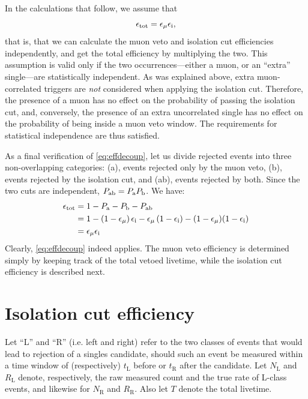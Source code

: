 \documentclass[../thesis.tex]{subfiles}
\begin{document}
In the calculations that follow, we assume that
\begin{equation}
  \label{eq:effdecoup}
  \epsilon_\mathrm{tot} = \epsilon_\mathrm{\mu} \epsilon_\mathrm{i},
\end{equation}
that is, that we can calculate the muon veto and isolation cut efficiencies
independently, and get the total efficiency by multiplying the two. This
assumption is valid only if the two occurrences---either a muon, or an ``extra''
single---are statistically independent. As was explained above, extra
muon-correlated triggers are \emph{not} considered when applying the isolation
cut. Therefore, the presence of a muon has no effect on the probability of
passing the isolation cut, and, conversely, the presence of an extra
uncorrelated single has no effect on the probability of being inside a muon veto
window. The requirements for statistical independence are thus satisfied.

As a final verification of \autoref{eq:effdecoup}, let us divide rejected events
into three non-overlapping categories: (a), events rejected only by the muon
veto, (b), events rejected by the isolation cut, and (ab), events rejected by
both. Since the two cuts are independent, $P_\mathrm{ab} = P_\mathrm{a}P_\mathrm{b}$. We have:
\begin{align*}
  \epsilon_\mathrm{tot} &= 1 - P_\mathrm{a} - P_\mathrm{b} - P_\mathrm{ab} \\
        &= 1 - (1-\epsilon_\mathrm{\mu})\,\epsilon_\mathrm{i} - \epsilon_\mathrm{\mu}\,(1-\epsilon_\mathrm{i}) - (1-\epsilon_\mathrm{\mu})(1-\epsilon_\mathrm{i}) \\
        &= \epsilon_\mathrm{\mu} \epsilon_\mathrm{i}
\end{align*}
Clearly, \autoref{eq:effdecoup} indeed applies. The muon veto efficiency is
determined simply by keeping track of the total vetoed livetime, while the
isolation cut efficiency is described next.


\section{Isolation cut efficiency}
\label{sec:isolcuteff}

\newcommand\NL{\ensuremath{N_{\mathrm{L}}}}
\newcommand\RL{\ensuremath{R_{\mathrm{L}}}}
\newcommand\tL{\ensuremath{t_{\mathrm{L}}}}
\newcommand\NR{\ensuremath{N_{\mathrm{R}}}}
\newcommand\RR{\ensuremath{R_{\mathrm{R}}}}
\newcommand\tR{\ensuremath{t_{\mathrm{R}}}}

Let ``L'' and ``R'' (i.e. left and right) refer to the two classes of events that would lead to rejection of a singles candidate, should such an event be measured within a time window of (respectively) $\tL$ before or $\tR$ after the candidate. Let $\NL$ and $\RL$ denote, respectively, the raw measured count and the true rate of L-class events, and likewise for $\NR$ and $\RR$. Also let $T$ denote the total livetime.
\end{document}
